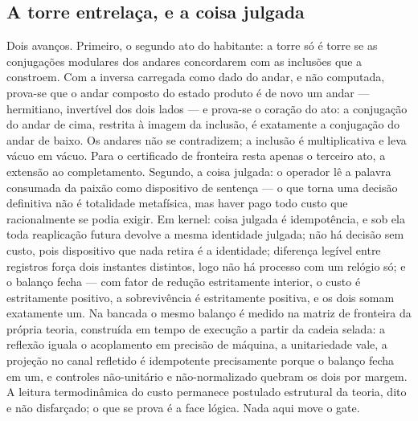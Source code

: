 \documentclass[11pt]{article}
\theoremstyle{definition}\newtheorem{deriv}{Derivação}
\begin{document}
\subsection*{A torre entrela\c{c}a, e a coisa julgada}Dois avan\c{c}os. Primeiro, o segundo ato do habitante: a torre s\'o \'e torre se as conjuga\c{c}\~oes modulares dos andares concordarem com as inclus\~oes que a constroem. Com a inversa carregada como dado do andar, e n\~ao computada, prova-se que o andar composto do estado produto \'e de novo um andar --- hermitiano, invert\'ivel dos dois lados --- e prova-se o cora\c{c}\~ao do ato: a conjuga\c{c}\~ao do andar de cima, restrita \`a imagem da inclus\~ao, \'e exatamente a conjuga\c{c}\~ao do andar de baixo. Os andares n\~ao se contradizem; a inclus\~ao \'e multiplicativa e leva v\'acuo em v\'acuo. Para o certificado de fronteira resta apenas o terceiro ato, a extens\~ao ao completamento. Segundo, a coisa julgada: o operador l\^e a palavra consumada da paix\~ao como dispositivo de senten\c{c}a --- o que torna uma decis\~ao definitiva n\~ao \'e totalidade metaf\'isica, mas haver pago todo custo que racionalmente se podia exigir. Em kernel: coisa julgada \'e idempot\^encia, e sob ela toda reaplica\c{c}\~ao futura devolve a mesma identidade julgada; n\~ao h\'a decis\~ao sem custo, pois dispositivo que nada retira \'e a identidade; diferen\c{c}a leg\'ivel entre registros for\c{c}a dois instantes distintos, logo n\~ao h\'a processo com um rel\'ogio s\'o; e o balan\c{c}o fecha --- com fator de redu\c{c}\~ao estritamente interior, o custo \'e estritamente positivo, a sobreviv\^encia \'e estritamente positiva, e os dois somam exatamente um. Na bancada o mesmo balan\c{c}o \'e medido na matriz de fronteira da pr\'opria teoria, constru\'ida em tempo de execu\c{c}\~ao a partir da cadeia selada: a reflex\~ao iguala o acoplamento em precis\~ao de m\'aquina, a unitariedade vale, a proje\c{c}\~ao no canal refletido \'e idempotente precisamente porque o balan\c{c}o fecha em um, e controles n\~ao-unit\'ario e n\~ao-normalizado quebram os dois por margem. A leitura termodin\^amica do custo permanece postulado estrutural da teoria, dito e n\~ao disfar\c{c}ado; o que se prova \'e a face l\'ogica. Nada aqui move o gate.
\end{document}
